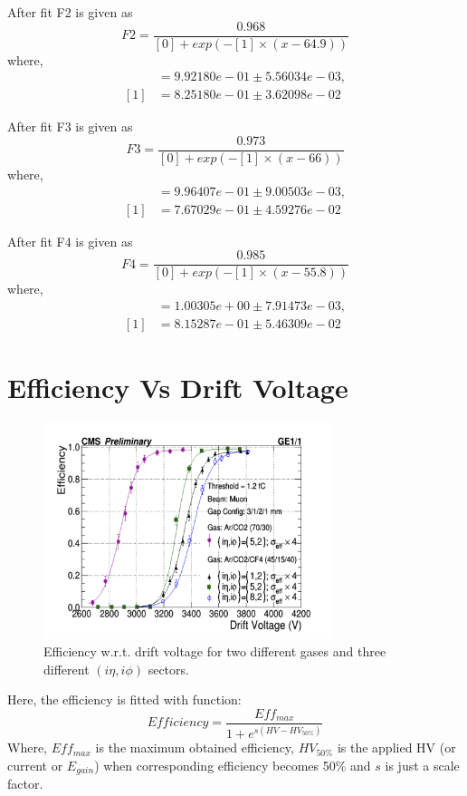 After fit F2 is given as
\begin{equation}
	F2 = \frac{0.968}{[0]+exp(-[1]\times(x-64.9))}
\end{equation}
where,
\begin{align*}
[0] &= 9.92180e-01 \pm 5.56034e-03,\\
[1] &= 8.25180e-01 \pm 3.62098e-02
\end{align*} 

After fit F3 is given as
\begin{equation}
	F3 = \frac{0.973}{[0]+exp(-[1]\times(x-66))}
\end{equation}
where,
\begin{align*}
[0] &= 9.96407e-01 \pm 9.00503e-03, \\
[1] &= 7.67029e-01 \pm 4.59276e-02
\end{align*}


After fit F4 is given as
\begin{equation}
	F4 = \frac{0.985}{[0]+exp(-[1]\times(x-55.8))}
\end{equation}
where,
\begin{align*}
[0] &= 1.00305e+00 \pm 7.91473e-03,\\
[1] &= 8.15287e-01 \pm 5.46309e-02
\end{align*}





\section{Efficiency Vs Drift Voltage} %
\label{sec:efficiency_vs_Drift_Voltage}
\begin{figure}[!htbp]
\centering
\includegraphics[width=0.75\textwidth]{figures/GEM/Efficiency_DriftVoltage.jpeg}
\caption{Efficiency w.r.t. drift voltage for two different gases and three different $(i\eta,i\phi)$ sectors.}
\label{Efficiency}
\end{figure}
Here, the efficiency is fitted with function:
\begin{equation}\label{EfffitEq}
    Efficiency = \frac{Eff_{max}}{1+e^{s(HV-HV_{50\%})}}
\end{equation}
Where, $Eff_{max}$ is the maximum obtained efficiency, $HV_{50\%}$ is the applied HV (or current or $E_{gain}$) when corresponding efficiency becomes 50\% and $s$ is just a scale factor.

